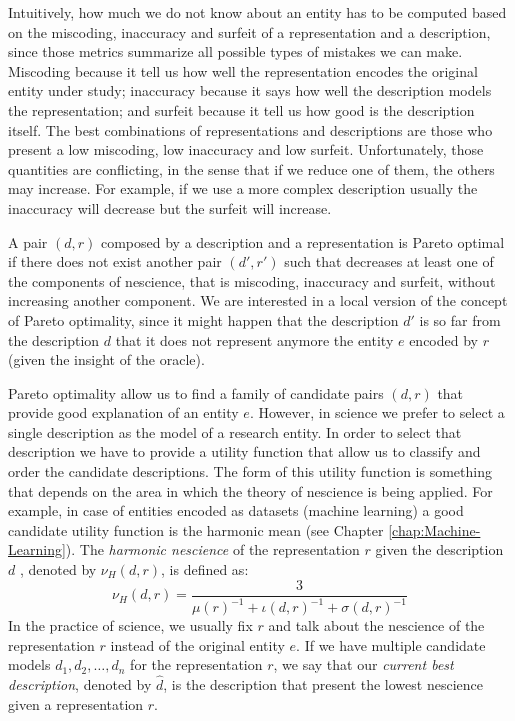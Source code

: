 Intuitively, how much we do not know about an entity has to be computed based on the miscoding, inaccuracy and surfeit of a representation and a description, since those metrics summarize all possible types of mistakes we can make. Miscoding because it tell us how well the representation encodes the original entity under study; inaccuracy because it says how well the description models the representation; and surfeit because it tell us how good is the description itself. The best combinations of representations and descriptions are those who present a low miscoding, low inaccuracy and low surfeit. Unfortunately, those quantities are conflicting, in the sense that if we reduce one of them, the others may increase. For example, if we use a more complex description usually the inaccuracy will decrease but the surfeit will increase.

A pair $(d, r)$ composed by a description and a representation is Pareto optimal if there does not exist another pair $(d', r')$ such that decreases at least one of the components of nescience, that is miscoding, inaccuracy and surfeit, without increasing another component. We are interested in a local version of the concept of Pareto optimality, since it might happen that the description $d'$ is so far from the description $d$ that it does not represent anymore the entity $e$ encoded by $r$ (given the insight of the oracle).

Pareto optimality allow us to find a family of candidate pairs $(d, r)$ that provide good explanation of an entity $e$. However, in science we prefer to select a single description as the model of a research entity. In order to select that description we have to provide a utility function that allow us to classify and order the candidate descriptions. The form of this utility function is something that depends on the area in which the theory of nescience is being applied. For example, in case of entities encoded as datasets (machine learning) a good candidate utility function is the harmonic mean (see Chapter \ref{chap:Machine-Learning}). The \emph{harmonic nescience} of the representation $r$ given the description $d$ , denoted by $\nu_H\left(d, r\right)$, is defined as:
\[
\nu_H\left(d, r \right) = \frac{3}{ \mu(r)^{-1} + \iota(d, r)^{-1} + \sigma(d, r)^{-1}} 
\]
In the practice of science, we usually fix $r$ and talk about the nescience of the representation $r$ instead of the original entity $e$. If we have multiple candidate models $d_1, d_2, \ldots, d_n$ for the representation $r$, we say that our \emph{current best description}, denoted by $\hat{d}$, is the description that present the lowest nescience given a representation $r$.

